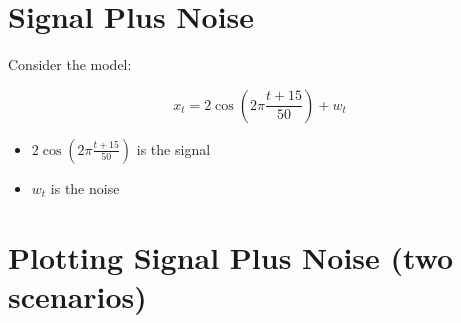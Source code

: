 \documentclass[
  letterpaper,
  DIV=11,
  numbers=noendperiod]{scrreprt}
\begin{document}
\section{Signal Plus Noise}\label{signal-plus-noise}

Consider the model:

\[
x_t = 2\cos(2\pi\frac{t + 15}{50}) + w_t
\]

\begin{itemize}
\item
  \(2\cos(2\pi\frac{t + 15}{50})\) is the signal
\item
  \(w_t\) is the noise
\end{itemize}

\section{\texorpdfstring{{Plotting Signal Plus Noise (two
scenarios)}}{Plotting Signal Plus Noise (two scenarios)}}\label{plotting-signal-plus-noise-two-scenarios}
\end{document}
